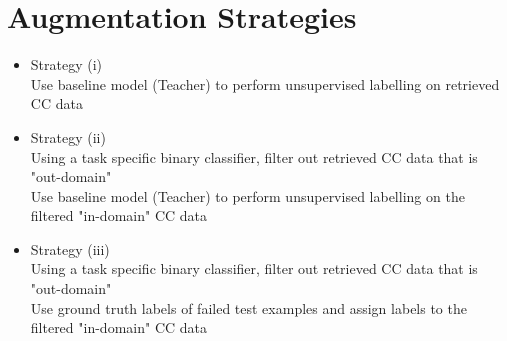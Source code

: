 \documentclass[11pt]{article}
\begin{document}
\section{Augmentation Strategies}
\label{sec:org14cc945}
\begin{itemize}
\item Strategy (i)\\
Use baseline model (Teacher) to perform unsupervised labelling on retrieved CC data
\item Strategy (ii)\\
Using a task specific binary classifier, 
filter out retrieved CC data that is "out-domain"\\
Use baseline model (Teacher) to perform unsupervised labelling on the filtered "in-domain" CC data
\item Strategy (iii)\\
Using a task specific binary classifier, 
filter out retrieved CC data that is "out-domain"\\
Use ground truth labels of failed test examples and assign labels to the filtered "in-domain" CC data
\end{itemize}
\end{document}
